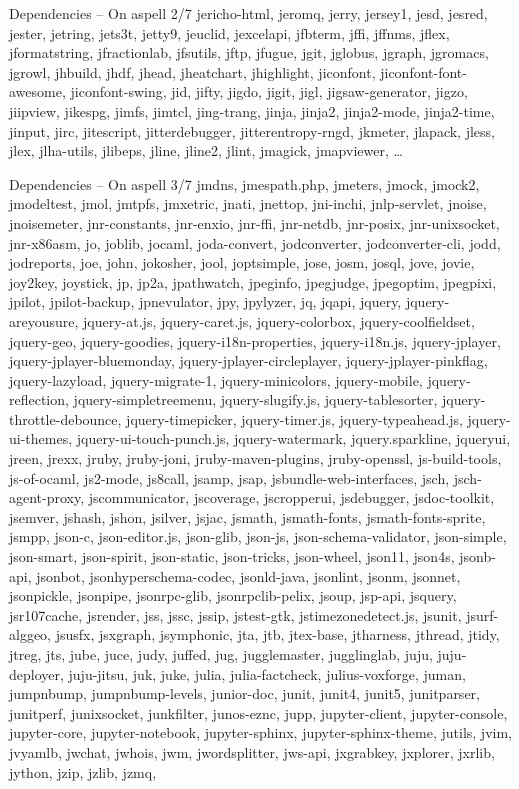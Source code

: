 \documentclass{beamer}
\begin{document}
\begin{frame}{Dependencies – On aspell 2/7}
jericho-html, jeromq, jerry, jersey1, jesd, jesred, jester, jetring, jets3t, jetty9, jeuclid, jexcelapi, jfbterm, jffi, jffnms, jflex, jformatstring, jfractionlab, jfsutils, jftp, jfugue, jgit, jglobus, jgraph, jgromacs, jgrowl, jhbuild, jhdf, jhead, jheatchart, jhighlight, jiconfont, jiconfont-font-awesome, jiconfont-swing, jid, jifty, jigdo, jigit, jigl, jigsaw-generator, jigzo, jiipview, jikespg, jimfs, jimtcl, jing-trang, jinja, jinja2, jinja2-mode, jinja2-time, jinput, jirc, jitescript, jitterdebugger, jitterentropy-rngd, jkmeter, jlapack, jless, jlex, jlha-utils, jlibeps, jline, jline2, jlint, jmagick, jmapviewer, …
\end{frame}

\begin{frame}{Dependencies – On aspell 3/7}
\tiny jmdns, jmespath.php, jmeters, jmock, jmock2, jmodeltest, jmol, jmtpfs, jmxetric, jnati, jnettop, jni-inchi, jnlp-servlet, jnoise, jnoisemeter, jnr-constants, jnr-enxio, jnr-ffi, jnr-netdb, jnr-posix, jnr-unixsocket, jnr-x86asm, jo, joblib, jocaml, joda-convert, jodconverter, jodconverter-cli, jodd, jodreports, joe, john, jokosher, jool, joptsimple, jose, josm, josql, jove, jovie, joy2key, joystick, jp, jp2a, jpathwatch, jpeginfo, jpegjudge, jpegoptim, jpegpixi, jpilot, jpilot-backup, jpnevulator, jpy, jpylyzer, jq, jqapi, jquery, jquery-areyousure, jquery-at.js, jquery-caret.js, jquery-colorbox, jquery-coolfieldset, jquery-geo, jquery-goodies, jquery-i18n-properties, jquery-i18n.js, jquery-jplayer, jquery-jplayer-bluemonday, jquery-jplayer-circleplayer, jquery-jplayer-pinkflag, jquery-lazyload, jquery-migrate-1, jquery-minicolors, jquery-mobile, jquery-reflection, jquery-simpletreemenu, jquery-slugify.js, jquery-tablesorter, jquery-throttle-debounce, jquery-timepicker, jquery-timer.js, jquery-typeahead.js, jquery-ui-themes, jquery-ui-touch-punch.js, jquery-watermark, jquery.sparkline, jqueryui, jreen, jrexx, jruby, jruby-joni, jruby-maven-plugins, jruby-openssl, js-build-tools, js-of-ocaml, js2-mode, js8call, jsamp, jsap, jsbundle-web-interfaces, jsch, jsch-agent-proxy, jscommunicator, jscoverage, jscropperui, jsdebugger, jsdoc-toolkit, jsemver, jshash, jshon, jsilver, jsjac, jsmath, jsmath-fonts, jsmath-fonts-sprite, jsmpp, json-c, json-editor.js, json-glib, json-js, json-schema-validator, json-simple, json-smart, json-spirit, json-static, json-tricks, json-wheel, json11, json4s, jsonb-api, jsonbot, jsonhyperschema-codec, jsonld-java, jsonlint, jsonm, jsonnet, jsonpickle, jsonpipe, jsonrpc-glib, jsonrpclib-pelix, jsoup, jsp-api, jsquery, jsr107cache, jsrender, jss, jssc, jssip, jstest-gtk, jstimezonedetect.js, jsunit, jsurf-alggeo, jsusfx, jsxgraph, jsymphonic, jta, jtb, jtex-base, jtharness, jthread, jtidy, jtreg, jts, jube, juce, judy, juffed, jug, jugglemaster, jugglinglab, juju, juju-deployer, juju-jitsu, juk, juke, julia, julia-factcheck, julius-voxforge, juman, jumpnbump, jumpnbump-levels, junior-doc, junit, junit4, junit5, junitparser, junitperf, junixsocket, junkfilter, junos-eznc, jupp, jupyter-client, jupyter-console, jupyter-core, jupyter-notebook, jupyter-sphinx, jupyter-sphinx-theme, jutils, jvim, jvyamlb, jwchat, jwhois, jwm, jwordsplitter, jws-api, jxgrabkey, jxplorer, jxrlib, jython, jzip, jzlib, jzmq, 
\end{frame}
\end{document}
